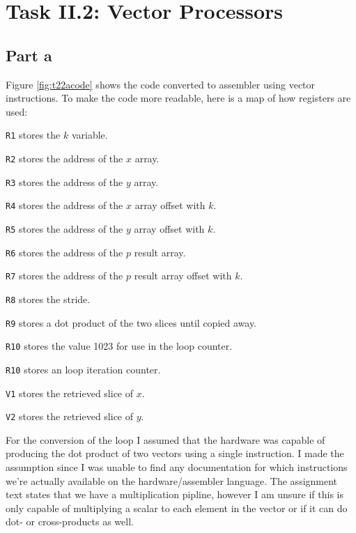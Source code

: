 \section{Task II.2: Vector Processors}

\subsection{Part a}
Figure \ref{fig:t22acode} shows the code converted to assembler using vector
instructions. To make the code more readable, here is a map of how registers are
used:
\begin{itemize*}
    \item[\texttt{R1}] stores the $k$ variable.
    \item[\texttt{R2}] stores the address of the $x$ array.
    \item[\texttt{R3}] stores the address of the $y$ array.
    \item[\texttt{R4}] stores the address of the $x$ array offset with $k$.
    \item[\texttt{R5}] stores the address of the $y$ array offset with $k$.
    \item[\texttt{R6}] stores the address of the $p$ result array.
    \item[\texttt{R7}] stores the address of the $p$ result array offset with $k$.
    \item[\texttt{R8}] stores the stride.
    \item[\texttt{R9}] stores a dot product of the two slices until copied away.
    \item[\texttt{R10}] stores the value 1023 for use in the loop counter.
    \item[\texttt{R10}] stores an loop iteration counter.
    \item[\texttt{V1}] stores the retrieved slice of $x$.
    \item[\texttt{V2}] stores the retrieved slice of $y$.
\end{itemize*}

For the conversion of the loop I assumed that the hardware was capable of
producing the dot product of two vectors using a single instruction. I made the
assumption since I was unable to find any documentation for which instructions
we're actually available on the hardware/assembler language. The assignment text
states that we have  a multiplication pipline, however I am unsure if this is
only capable of multiplying a scalar to each element in the vector or if it can
do dot- or cross-products as well.

